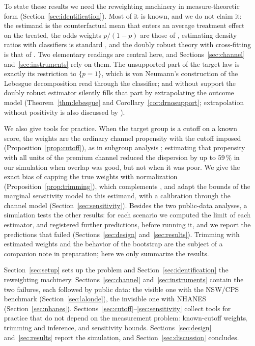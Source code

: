 To state these results we need the reweighting machinery in measure-theoretic form (Section~\ref{sec:identification}). Most of it is known, and we do not claim it: the estimand is the counterfactual mean that enters an average treatment effect on the treated, the odds weights $p/(1-p)$ are those of \citet{hirano2003}, estimating density ratios with classifiers is standard \citep{qin1998,bickel2009,sugiyama2012}, and the doubly robust theory with cross-fitting is that of \citet{chernozhukov2018}. Two elementary readings are central here, and Sections~\ref{sec:channel} and~\ref{sec:instruments} rely on them. The unsupported part of the target law is exactly its restriction to $\{p=1\}$, which is von Neumann's construction of the Lebesgue decomposition \citep[Theorem 6.10]{rudin1987} read through the classifier; and without support the doubly robust estimator silently fills that part by extrapolating the outcome model (Theorem~\ref{thm:lebesgue} and Corollary~\ref{cor:drnosupport}; extrapolation without positivity is also discussed by \citet{petersen2012}).

We also give tools for practice. When the target group is a cutoff on a known score, the weights are the ordinary channel propensity with the cutoff imposed (Proposition~\ref{prop:cutoff}), as in subgroup analysis \citep{rassen2012}; estimating that propensity with all units of the premium channel reduced the dispersion by up to 59\,\% in our simulation when overlap was good, but not when it was poor. We give the exact bias of capping the true weights with normalization (Proposition~\ref{prop:trimming}), which complements \citet{ma2020}, and adapt the bounds of the marginal sensitivity model \citep{tan2006,dorn2023} to this estimand, with a calibration through the channel model (Section~\ref{sec:sensitivity}). Besides the two public-data analyses, a simulation tests the other results: for each scenario we computed the limit of each estimator, and registered further predictions, before running it, and we report the predictions that failed (Sections~\ref{sec:design} and~\ref{sec:results}). Trimming with estimated weights and the behavior of the bootstrap are the subject of a companion note in preparation; here we only summarize the results.

Section~\ref{sec:setup} sets up the problem and Section~\ref{sec:identification} the reweighting machinery. Sections~\ref{sec:channel} and~\ref{sec:instruments} contain the two failures, each followed by public data: the visible one with the NSW/CPS benchmark (Section~\ref{sec:lalonde}), the invisible one with NHANES (Section~\ref{sec:nhanes}). Sections~\ref{sec:cutoff}--\ref{sec:sensitivity} collect tools for practice that do not depend on the measurement problem: known-cutoff weights, trimming and inference, and sensitivity bounds. Sections~\ref{sec:design} and~\ref{sec:results} report the simulation, and Section~\ref{sec:discussion} concludes.

